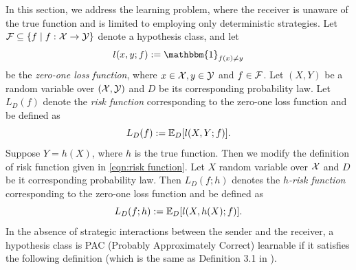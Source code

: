 In this section, we address the learning problem, where the receiver is unaware of the true function and is limited to employing only deterministic strategies. Let $\mathcal{F} \subseteq \{f \mid f:\mathcal{X} \rightarrow \mathcal{Y}\}$  denote a hypothesis class, and let  $$ l(x,y; f) := \mathbbm{1}_{f(x) \neq y} $$
be the \textit{zero-one loss function}, where $x \in \mathcal{X}, y \in \mathcal{Y}$ and $f \in \mathcal{F}$.
Let $(X,Y)$ be a random variable over $(\mathcal{X},\mathcal{Y})$ and $D$ be its corresponding probability law.
Let $L_{D}(f)$ denote the \textit{risk function} corresponding to the zero-one loss function and be defined as 
\begin{equation}\label{eqn:risk function}
    L_D(f) :=
    \mathbb{E}_{D}[l(X,Y;f)].
\end{equation}
Suppose $Y = h(X)$, where $h$ is the true function. Then we modify the definition of risk function given in \eqref{eqn:risk function}.
Let $X$ random variable over $\mathcal{X}$ and $D$ be it corresponding probability law. Then $L_D(f;h)$ denotes the \textit{$h$-risk function} corresponding to the zero-one loss function and be defined as 
\begin{equation}
L_D(f;h) :=   \mathbb{E}_{D}[l(X,h(X);f)].
\end{equation}
In the absence of strategic interactions between the sender and the receiver, a hypothesis class is PAC (Probably Approximately Correct) learnable if it satisfies the following definition (which is the same as Definition 3.1 in \cite{shalev-shwartz_ben-david_2014}).

